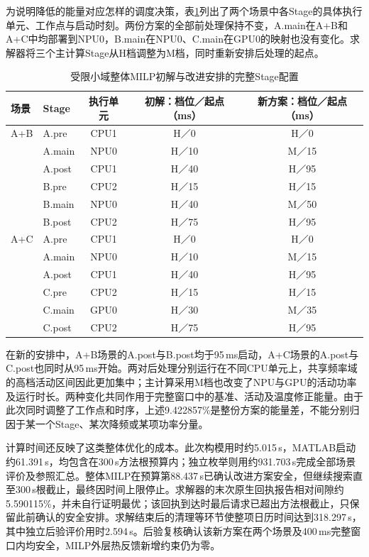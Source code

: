 为说明降低的能量对应怎样的调度决策，表\ref{tab:exp-small-schedule}列出了两个场景中各Stage的具体执行单元、工作点与启动时刻。两份方案的全部前处理保持不变，A.main在A+B和A+C中均部署到NPU0，B.main在NPU0、C.main在GPU0的映射也没有变化。求解器将三个主计算Stage从H档调整为M档，同时重新安排后处理的起点。

\begin{table}[htbp]
\centering
\small
\caption{受限小域整体MILP初解与改进安排的完整Stage配置}
\label{tab:exp-small-schedule}
\begin{tabular}{llccc}
\toprule
场景 & Stage & 执行单元 & 初解：档位／起点（ms） & 新方案：档位／起点（ms） \\
\midrule
A+B & A.pre  & CPU1 & H／0  & H／0 \\
    & A.main & NPU0 & H／10 & M／15 \\
    & A.post & CPU1 & H／40 & H／95 \\
    & B.pre  & CPU2 & H／15 & H／15 \\
    & B.main & NPU0 & H／40 & M／50 \\
    & B.post & CPU2 & H／75 & H／95 \\
\midrule
A+C & A.pre  & CPU1 & H／0  & H／0 \\
    & A.main & NPU0 & H／10 & M／15 \\
    & A.post & CPU1 & H／40 & H／95 \\
    & C.pre  & CPU2 & H／15 & H／15 \\
    & C.main & GPU0 & H／30 & M／35 \\
    & C.post & CPU2 & H／75 & H／95 \\
\bottomrule
\end{tabular}
\end{table}
\FloatBarrier

在新的安排中，A+B场景的A.post与B.post均于95\,ms启动，A+C场景的A.post与C.post也同时从95\,ms开始。两对后处理分别运行在不同CPU单元上，共享频率域的高档活动区间因此更加集中；主计算采用M档也改变了NPU与GPU的活动功率及运行时长。两种变化共同作用于完整窗口中的基准、活动及温度修正能量。由于此次同时调整了工作点和时序，上述9.422857\%是整份方案的能量差，不能分别归因于某一个Stage、某次降频或某项功率分量。

计算时间还反映了这类整体优化的成本。此次构模用时约5.015\,s，MATLAB启动约61.391\,s，均包含在300\,s方法根预算内；独立枚举则用约931.703\,s完成全部场景评价及参照汇总。整体MILP在预算第88.437\,s已确认改进方案安全，但继续搜索直至300\,s根截止，最终因时间上限停止。求解器的末次原生回执报告相对间隙约5.590115\%，并未自行证明最优；该回执到达时最后请求已超出方法根截止，只保留此前确认的安全安排。求解结束后的清理等环节使整项日历时间达到318.297\,s，其中独立后验评价用时2.594\,s。后验复核确认该新方案在两个场景及400\,ms完整窗口内均安全，MILP外层热反馈新增约束仍为零。

